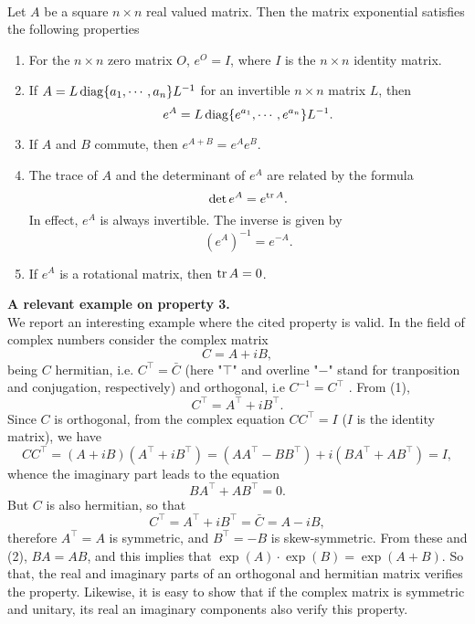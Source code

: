 \documentclass[12pt]{article}
\begin{document}
{\bf {}} \\
Let $A$ be a square $n\times n$ real valued matrix.
Then the matrix exponential satisfies the following properties
\begin{enumerate}
\item For the $n\times n$ zero matrix $O$, $e^O=I$, where $I$ is the
$n\times n$ identity matrix.
\item If $A=L\mathop{\mathrm{diag}}\{a_1,\cdots, a_n\} L^{-1}$ for an invertible $n\times n$
matrix $L$, then 
$$ e^A = L \mathop{\mathrm{diag}}\{e^{a_1},\cdots, e^{a_n}\} L^{-1}.$$
\item If $A$ and $B$ commute, 
then $e^{A+B} = e^{A} e^B$.
\item The trace of $A$ and the determinant of $e^A$ are related by the formula
$$ \det e^A = e^{\mathop{\mathrm{tr}} A}.$$
In effect, $e^A$ is always invertible. The inverse is given by 
$$ (e^A)^{-1} = e^{-A}.$$
\item If $e^A$ is a rotational matrix, then $\mathop{\mathrm{tr}} A=0$. 
\end{enumerate}
{\bf A relevant example on property 3.} \\
We report an interesting example where the cited property is valid. In the field of complex numbers consider the complex matrix 
\begin{equation}
C = A + iB,
\end{equation} 
being $C$ hermitian, i.e. $C^\intercal = \bar{C}$ (here "$\intercal$" and overline "$-$" stand for tranposition and conjugation, respectively) and orthogonal, i.e $C^{-1} = C^\intercal$ . From (1), 
\begin{equation*}
C^\intercal = A^\intercal + iB^\intercal.
\end{equation*}
Since $C$ is orthogonal, from the complex equation $CC^\intercal = I$ ($I$ is the identity matrix), we have
\begin{equation*}
CC^\intercal = (A + iB)(A^\intercal + iB^\intercal) = (AA^\intercal - BB^\intercal) + i(BA^\intercal + AB^\intercal) = I,
\end{equation*}
whence the imaginary part leads to the equation
\begin{equation}
BA^\intercal + AB^\intercal = 0.
\end{equation}
But $C$ is also hermitian, so that
\begin{equation*}
C^\intercal = A^\intercal + iB^\intercal = \bar{C} = A - iB,
\end{equation*}
therefore $A^\intercal = A$ is symmetric, and $B^\intercal = -B$ is skew-symmetric. From these and (2), $BA = AB$, and this implies that $\exp(A)\cdot \exp(B) = \exp(A + B)$. So that, the real and imaginary parts of an orthogonal and hermitian matrix verifies the property. Likewise, it is easy to show that if the complex matrix is symmetric and unitary, its real an imaginary components also verify this property.

\end{document}
